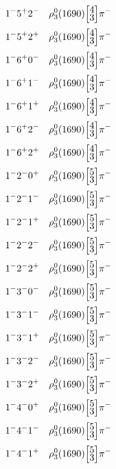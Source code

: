 \documentclass[10pt,a4paper]{article}
\def\dst{\displaystyle}
\def\vsp{\hbox{\vrule height12.5pt depth3.5pt width0pt}}
\def\ells#1#2{\Big[\hskip-5pt\vsp\begin{array}{c}\dst#1\\[-4pt]\dst#2\end{array}\vsp\hskip-5pt\Big]}
\begin{document}
\begin{align*} 
 \begin{aligned}
1^{-}5^{+}2^{-}\quad & \rho_3^0(1690)\ells{4}{3}\pi^-\\
1^{-}5^{+}2^{+}\quad & \rho_3^0(1690)\ells{4}{3}\pi^-\\
1^{-}6^{+}0^{-}\quad & \rho_3^0(1690)\ells{4}{3}\pi^-\\
1^{-}6^{+}1^{-}\quad & \rho_3^0(1690)\ells{4}{3}\pi^-\\
1^{-}6^{+}1^{+}\quad & \rho_3^0(1690)\ells{4}{3}\pi^-\\
1^{-}6^{+}2^{-}\quad & \rho_3^0(1690)\ells{4}{3}\pi^-\\
1^{-}6^{+}2^{+}\quad & \rho_3^0(1690)\ells{4}{3}\pi^-\\
1^{-}2^{-}0^{+}\quad & \rho_3^0(1690)\ells{5}{3}\pi^-\\
1^{-}2^{-}1^{-}\quad & \rho_3^0(1690)\ells{5}{3}\pi^-\\
1^{-}2^{-}1^{+}\quad & \rho_3^0(1690)\ells{5}{3}\pi^-\\
1^{-}2^{-}2^{-}\quad & \rho_3^0(1690)\ells{5}{3}\pi^-\\
1^{-}2^{-}2^{+}\quad & \rho_3^0(1690)\ells{5}{3}\pi^-\\
1^{-}3^{-}0^{-}\quad & \rho_3^0(1690)\ells{5}{3}\pi^-\\
1^{-}3^{-}1^{-}\quad & \rho_3^0(1690)\ells{5}{3}\pi^-\\
1^{-}3^{-}1^{+}\quad & \rho_3^0(1690)\ells{5}{3}\pi^-\\
1^{-}3^{-}2^{-}\quad & \rho_3^0(1690)\ells{5}{3}\pi^-\\
1^{-}3^{-}2^{+}\quad & \rho_3^0(1690)\ells{5}{3}\pi^-\\
1^{-}4^{-}0^{+}\quad & \rho_3^0(1690)\ells{5}{3}\pi^-\\
1^{-}4^{-}1^{-}\quad & \rho_3^0(1690)\ells{5}{3}\pi^-\\
1^{-}4^{-}1^{+}\quad & \rho_3^0(1690)\ells{5}{3}\pi^-\\
\end{aligned} 
 \end{align*}\pagebreak
\end{document}
